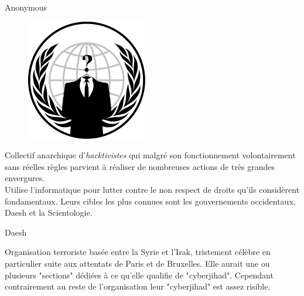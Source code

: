 \documentclass{beamer}
\begin{document}
\begin{frame}{Anonymous}

    \begin{figure}[h]
        \includegraphics[scale=0.15]{Anonymous_emblem}
    \end{figure}

Collectif anarchique d'\emph{hacktivistes} qui malgré son fonctionnement volontairement sans réelles règles parvient à réaliser de nombreuses actions de très grandes envergures.\\ Utilise l'informatique pour lutter contre le non respect de droits qu'ils considèrent fondamentaux. Leurs cibles les plus connues sont les gouvernements occidentaux, Daesh et la Scientologie.


\end{frame}

\begin{frame}{Daesh}

Organisation terroriste basée entre la Syrie et l'Irak, tristement célèbre en particulier suite aux attentats de Paris et de Bruxelles. Elle aurait une ou plusieurs "sections" dédiées à ce qu'elle qualifie de "cyberjihad". Cependant contrairement au reste de l'organisation leur "cyberjihad" est assez risible.



\end{frame}
\end{document}
